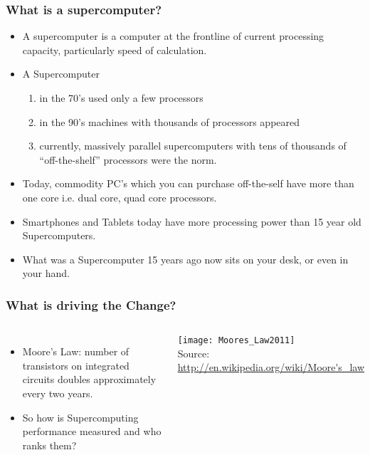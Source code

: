 \documentclass[slidestop,mathserif,compress,xcolor=svgnames,table]{beamer}
\begin{document}
\begin{frame}
  \frametitle{\small What is a supercomputer?}
  \begin{itemize}
    \item A supercomputer is a computer at the frontline of current processing capacity, particularly speed of calculation.
    \item A Supercomputer
    \begin{enumerate}
        \item in the 70's used only a few processors
        \item in the 90's machines with thousands of processors appeared
        \item currently, massively parallel supercomputers with tens of thousands of ``off-the-shelf'' processors were the norm.
    \end{enumerate}
    \item Today, commodity PC's which you can purchase off-the-self have more than one core i.e. dual core, quad core processors.
    \item Smartphones and Tablets today have more processing power than 15 year old Supercomputers.
    \item What was a Supercomputer 15 years ago now sits on your desk, or even in your hand.
 \end{itemize}
\end{frame}

\begin{frame}
  \frametitle{\small What is driving the Change?}
  \begin{columns}
    \begin{itemize}
      \item Moore's Law: number of transistors on integrated circuits doubles approximately every two years. 
      \item So how is Supercomputing performance measured and who ranks them?
     \end{itemize}
    \begin{center}
      \texttt{[image: Moores\_Law2011]}\\
		      {\tiny Source: \url{http://en.wikipedia.org/wiki/Moore's_law}}
    \end{center}
  \end{columns}
\end{frame}
\end{document}
